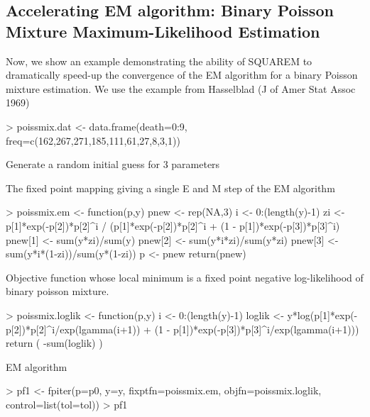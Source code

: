 \documentclass[english]{article}
\begin{document}
\subsection{Accelerating EM algorithm: Binary Poisson Mixture Maximum-Likelihood Estimation}
Now, we show an example demonstrating the ability of SQUAREM to dramatically speed-up the convergence of the EM algorithm for a binary Poisson mixture estimation.   We use the example from Hasselblad (J of Amer Stat Assoc 1969)
\begin{Schunk}
\begin{Sinput}
> poissmix.dat <- data.frame(death=0:9, freq=c(162,267,271,185,111,61,27,8,3,1))
\end{Sinput}
\end{Schunk}

Generate a random initial guess for 3 parameters
\begin{Schunk}
\end{Schunk}

The fixed point mapping giving a single E and M step of the EM algorithm
 
\begin{Schunk}
\begin{Sinput}
> poissmix.em <- function(p,y) {
  pnew <- rep(NA,3)
  i <- 0:(length(y)-1)
  zi <- p[1]*exp(-p[2])*p[2]^i / (p[1]*exp(-p[2])*p[2]^i + (1 - p[1])*exp(-p[3])*p[3]^i)
  pnew[1] <- sum(y*zi)/sum(y)
  pnew[2] <- sum(y*i*zi)/sum(y*zi)
  pnew[3] <- sum(y*i*(1-zi))/sum(y*(1-zi))
  p <- pnew
  return(pnew)
  }
\end{Sinput}
\end{Schunk}

Objective function whose local minimum is a fixed point
negative log-likelihood of binary poisson mixture.

\begin{Schunk}
\begin{Sinput}
> poissmix.loglik <- function(p,y) {
  i <- 0:(length(y)-1)
  loglik <- y*log(p[1]*exp(-p[2])*p[2]^i/exp(lgamma(i+1)) + 
  		(1 - p[1])*exp(-p[3])*p[3]^i/exp(lgamma(i+1)))
  return ( -sum(loglik) )
  }
\end{Sinput}
\end{Schunk}

EM algorithm
\begin{Schunk}
\begin{Sinput}
> pf1 <- fpiter(p=p0, y=y, fixptfn=poissmix.em, objfn=poissmix.loglik, 
  control=list(tol=tol))
> pf1
\end{Sinput}
\end{Schunk}
\end{document}
